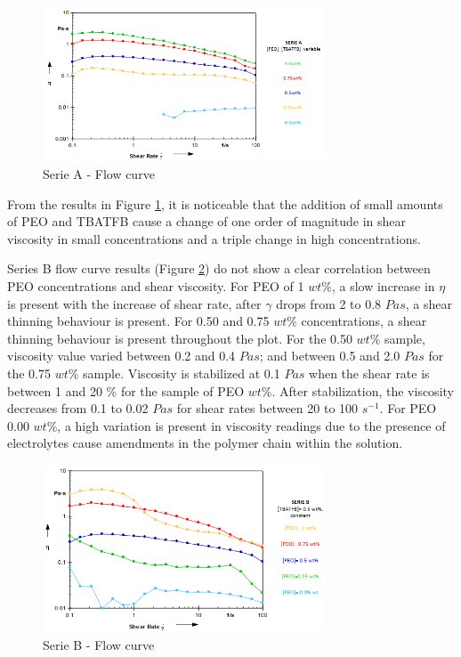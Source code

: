 \begin{figure}[th]
\centering
\includegraphics[width=0.75\textwidth]{./Figures/SerieAflowCurve.png}
\decoRule
\caption[Serie A - Flow curve]{Serie A - Flow curve \cite{Flores2017}}
\label{fig:SerieAflowCurve}
\end{figure}

From the results in Figure \ref{fig:SerieAflowCurve}, it is noticeable that the addition of small amounts of PEO and TBATFB cause a change of one order of magnitude in shear viscosity in small concentrations and a triple change in high concentrations.

Series B flow curve results (Figure \ref{fig:SerieBflowCurve}) do not show a clear correlation between PEO concentrations and shear viscosity. For PEO of 1 $w t \%$, a slow increase in $\eta$ is present with the increase of shear rate, after $\gamma$ drops from 2 to 0.8 $Pa s$, a shear thinning behaviour is present. For 0.50 and 0.75 $w t \%$ concentrations, a shear thinning behaviour is present throughout the plot. For the 0.50 $w t \%$ sample, viscosity value varied between 0.2 and 0.4 $Pa s$; and between 0.5 and 2.0 $Pa s$ for the 0.75 $w t \%$ sample. Viscosity is stabilized at 0.1 $Pa s$ when the shear rate is between 1 and 20 \% for the sample of PEO $w t \%$. After stabilization, the viscosity decreases from 0.1 to 0.02 $Pa s$ for shear rates between 20 to 100 $s^{-1}$. For PEO 0.00 $w t \%$, a high variation is present in viscosity readings due to the presence of electrolytes cause amendments in the polymer chain within the solution.

\begin{figure}[th]
\centering
\includegraphics[width=0.75\textwidth]{./Figures/SerieBflowCurve.png}
\decoRule
\caption[Serie B - Flow curve]{Serie B - Flow curve \cite{Flores2017}}
\label{fig:SerieBflowCurve}
\end{figure}

